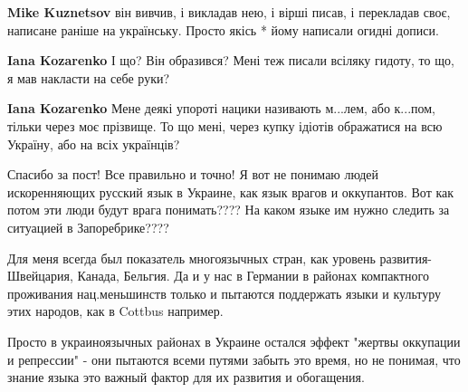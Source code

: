 \begin{itemize}
\begin{itemize}
 
\textbf{Mike Kuznetsov} він вивчив, і викладав нею, і вірші писав, і перекладав своє, написане раніше на українську. Просто якісь * йому написали огидні дописи.

 
\textbf{Iana Kozarenko} І що? Він образився? Мені теж писали всіляку гидоту, то що, я мав накласти на себе руки?

 
\textbf{Iana Kozarenko} Мене деякі упороті нацики називають м...лем, або к...пом, тільки через моє прізвище. То що мені, через купку ідіотів ображатися на всю Україну, або на всіх українців?
\end{itemize}

 

Спасибо за пост! Все правильно и точно! Я вот не понимаю людей искоренняющих
русский язык в Украине, как язык врагов и оккупантов. Вот как потом эти люди
будут врага понимать???? На каком языке им нужно следить за ситуацией в
Запоребрике????

Для меня всегда был показатель многоязычных стран, как уровень развития-
Швейцария, Канада, Бельгия. Да и у нас в Германии в районах компактного
проживания нац.меньшинств только и пытаются поддержать языки и культуру этих
народов, как в Cottbus например.

Просто в украиноязычных районах в Украине остался эффект "жертвы оккупации и
репрессии" - они пытаются всеми путями забыть это время, но не понимая, что
знание языка это важный фактор для их развития и обогащения.


\end{itemize}
